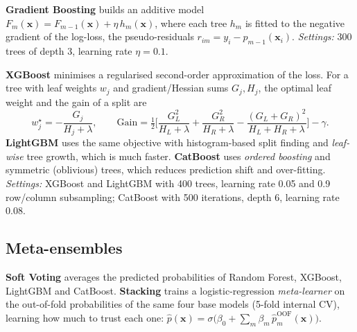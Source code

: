 \textbf{Gradient Boosting} builds an additive model $F_m(\mathbf x)=F_{m-1}(\mathbf x)+\eta\,h_m(\mathbf x)$, where each
tree $h_m$ is fitted to the negative gradient of the log-loss, the pseudo-residuals $r_{im}=y_i-p_{m-1}(\mathbf x_i)$.
\emph{Settings:} 300 trees of depth 3, learning rate $\eta=0.1$.

\textbf{XGBoost} minimises a regularised second-order approximation of the loss. For a tree with leaf weights $w_j$ and
gradient/Hessian sums $G_j,H_j$, the optimal leaf weight and the gain of a split are
\begin{equation}
w_j^\star=-\frac{G_j}{H_j+\lambda},\qquad
\text{Gain}=\tfrac12\Big[\frac{G_L^2}{H_L+\lambda}+\frac{G_R^2}{H_R+\lambda}-\frac{(G_L+G_R)^2}{H_L+H_R+\lambda}\Big]-\gamma .
\end{equation}
\textbf{LightGBM} uses the same objective with histogram-based split finding and \emph{leaf-wise} tree growth, which is
much faster. \textbf{CatBoost} uses \emph{ordered boosting} and symmetric (oblivious) trees, which reduces prediction
shift and over-fitting. \emph{Settings:} XGBoost and LightGBM with 400 trees, learning rate 0.05 and 0.9 row/column
subsampling; CatBoost with 500 iterations, depth 6, learning rate 0.08.

\subsection{Meta-ensembles}
\textbf{Soft Voting} averages the predicted probabilities of Random Forest, XGBoost, LightGBM and CatBoost.
\textbf{Stacking} trains a logistic-regression \emph{meta-learner} on the out-of-fold probabilities of the same four
base models (5-fold internal CV), learning how much to trust each one:
$\hat p(\mathbf x)=\sigma\big(\beta_0+\sum_{m}\beta_m\,\hat p_m^{\text{OOF}}(\mathbf x)\big)$.

